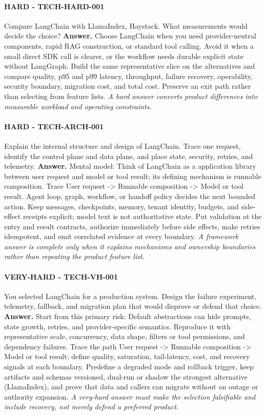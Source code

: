 \paragraph{HARD - TECH-HARD-001} Compare LangChain with LlamaIndex, Haystack. What measurements would decide the choice?
\textbf{Answer.} Choose LangChain when you need provider-neutral components, rapid RAG construction, or standard tool calling. Avoid it when a small direct SDK call is clearer, or the workflow needs durable explicit state without LangGraph. Build the same representative slice on the alternatives and compare quality, p95 and p99 latency, throughput, failure recovery, operability, security boundary, migration cost, and total cost. Preserve an exit path rather than selecting from feature lists.
\textit{A hard answer converts product differences into measurable workload and operating constraints.}
\paragraph{HARD - TECH-ARCH-001} Explain the internal structure and design of LangChain. Trace one request, identify the control plane and data plane, and place state, security, retries, and telemetry.
\textbf{Answer.} Mental model: Think of LangChain as a application library between user request and model or tool result; its defining mechanism is runnable composition. Trace User request -> Runnable composition -> Model or tool result. Agent loop, graph, workflow, or handoff policy decides the next bounded action. Keep messages, checkpoints, memory, tenant identity, budgets, and side-effect receipts explicit; model text is not authoritative state. Put validation at the entry and result contracts, authorize immediately before side effects, make retries idempotent, and emit correlated evidence at every boundary.
\textit{A framework answer is complete only when it explains mechanisms and ownership boundaries rather than repeating the product feature list.}
\paragraph{VERY-HARD - TECH-VH-001} You selected LangChain for a production system. Design the failure experiment, telemetry, fallback, and migration plan that would disprove or defend that choice.
\textbf{Answer.} Start from this primary risk: Default abstractions can hide prompts, state growth, retries, and provider-specific semantics. Reproduce it with representative scale, concurrency, data shape, filters or tool permissions, and dependency failures. Trace the path User request -> Runnable composition -> Model or tool result; define quality, saturation, tail-latency, cost, and recovery signals at each boundary. Predefine a degraded mode and rollback trigger, keep artifacts and schemas versioned, dual-run or shadow the strongest alternative (LlamaIndex), and prove that data and callers can migrate without an outage or authority expansion.
\textit{A very-hard answer must make the selection falsifiable and include recovery, not merely defend a preferred product.}
